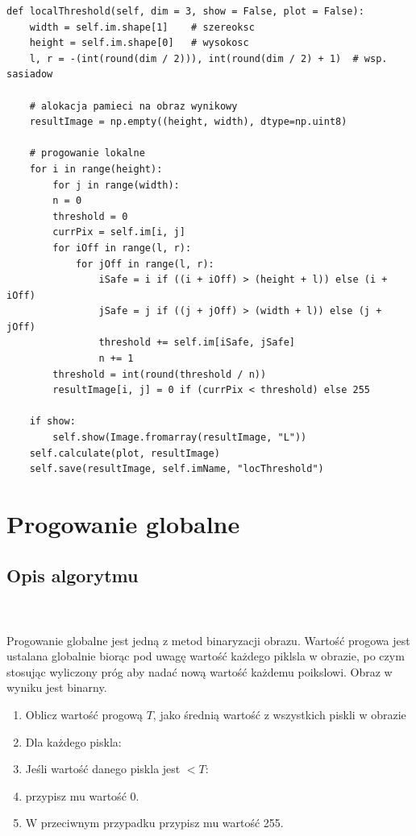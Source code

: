 \documentclass[final,a4paper,openany,12pt]{mwbk}
\begin{document}

\begin{lstlisting}[caption=Progowanie lokalne]
def localThreshold(self, dim = 3, show = False, plot = False):
	width = self.im.shape[1]    # szereoksc
	height = self.im.shape[0]   # wysokosc
	l, r = -(int(round(dim / 2))), int(round(dim / 2) + 1)  # wsp. sasiadow
	
	# alokacja pamieci na obraz wynikowy
	resultImage = np.empty((height, width), dtype=np.uint8)
	
	# progowanie lokalne
	for i in range(height):
		for j in range(width):
		n = 0
		threshold = 0
		currPix = self.im[i, j]
		for iOff in range(l, r):
			for jOff in range(l, r):
				iSafe = i if ((i + iOff) > (height + l)) else (i + iOff)
				jSafe = j if ((j + jOff) > (width + l)) else (j + jOff)
				threshold += self.im[iSafe, jSafe]
				n += 1
		threshold = int(round(threshold / n))
		resultImage[i, j] = 0 if (currPix < threshold) else 255
	
	if show:
		self.show(Image.fromarray(resultImage, "L"))
	self.calculate(plot, resultImage)
	self.save(resultImage, self.imName, "locThreshold")
\end{lstlisting}

\newpage
\clearpage




\section{Progowanie globalne}
\subsection*{Opis algorytmu}
\hfill
\\\\
\indent Progowanie globalne jest jedną z metod binaryzacji obrazu. Wartość progowa jest ustalana globalnie biorąc pod uwagę wartość każdego piklsla w obrazie, po czym stosując wyliczony próg aby nadać nową wartość każdemu poikslowi. Obraz w wyniku jest binarny.
\begin{enumerate}
	\item Oblicz wartość progową $T$, jako średnią wartość z wszystkich piskli w obrazie
	\item Dla każdego piskla:
	\item Jeśli wartość danego piskla jest $< T$:
	\item przypisz mu wartość $0$.
	\item W przeciwnym przypadku przypisz mu wartość 255.
\end{enumerate}
\end{document}
